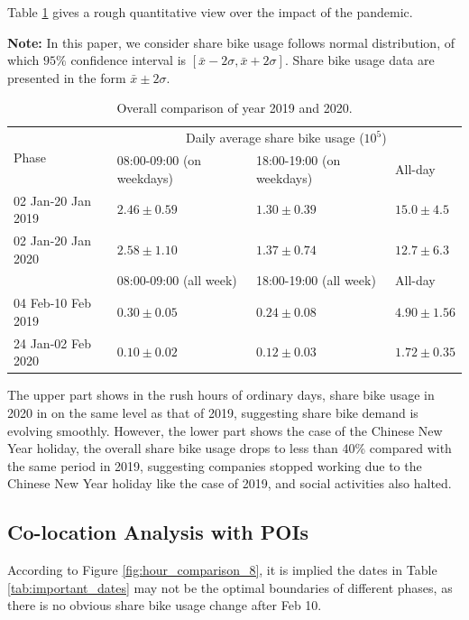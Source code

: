 \documentclass[ijgi,submit,moreauthors,pdftex]{Definitions/mdpi}
\begin{document}
Table \ref{tab:overall_comparison} gives a rough quantitative view over the impact of the pandemic.

\textbf{Note:} In this paper, we consider share bike usage follows normal distribution, of which $95\%$ confidence interval is $[\bar{x}-2\sigma,\bar{x}+2\sigma]$.
Share bike usage data are presented in the form $\bar{x}\pm2\sigma$.

\begin{table}[ht]
    \centering
    \begin{tabular}{|l|l|l|l|}
        \hline
        \multirow{2}{*}{Phase} &\multicolumn{3}{c|}{Daily average share bike usage ($10^{5}$)}\\
        \cline{2-4}
        & 08:00-09:00 (on weekdays) & 18:00-19:00 (on weekdays) & All-day\\
        \hline
        02 Jan-20 Jan 2019 & $2.46\pm0.59$ & $1.30\pm0.39$ & $15.0\pm4.5$\\
        \hline
        02 Jan-20 Jan 2020 & $2.58\pm1.10$ & $1.37\pm0.74$ & $12.7\pm6.3$\\
        \hline
        \hline
        & 08:00-09:00 (all week)  & 18:00-19:00 (all week) & All-day\\
        \hline
        04 Feb-10 Feb 2019 & $0.30\pm0.05$ & $0.24\pm0.08$ & $4.90\pm1.56$\\
        \hline
        24 Jan-02 Feb 2020 & $0.10\pm0.02$ & $0.12\pm0.03$ & $1.72\pm0.35$\\
        \hline
    \end{tabular}
    \caption{Overall comparison of year 2019 and 2020.}
    \label{tab:overall_comparison}
\end{table}

The upper part shows in the rush hours of ordinary days, share bike usage in 2020 in on the same level as that of 2019, suggesting share bike demand is evolving smoothly.
However, the lower part shows the case of the Chinese New Year holiday, the overall share bike usage drops to less than 40\% compared with the same period in 2019, suggesting companies stopped working due to the Chinese New Year holiday like the case of 2019, and social activities also halted. 

\subsection{Co-location Analysis with POIs}\label{sec:colo-poi}

According to Figure \ref{fig:hour_comparison_8}, it is implied the dates in Table \ref{tab:important_dates} may not be the optimal boundaries of different phases, as there is no obvious share bike usage change after Feb 10.
\end{document}
